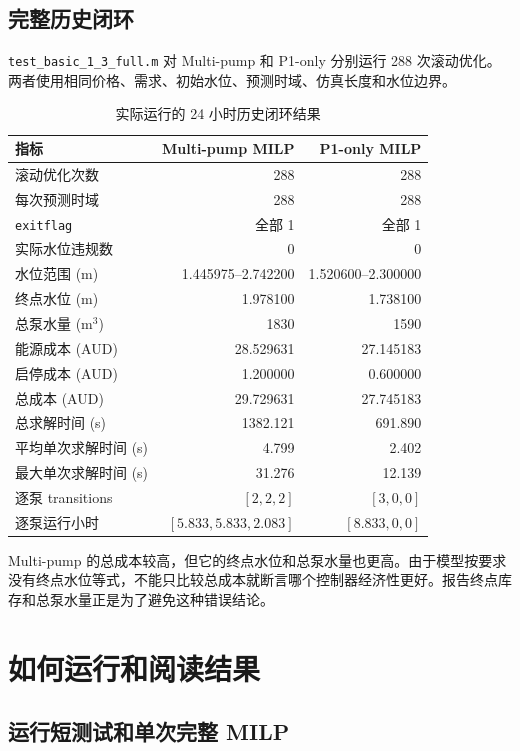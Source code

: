 \documentclass[UTF8,a4paper,11pt]{ctexart}
\newcommand{\code}[1]{\texttt{#1}}
\newcommand{\important}[1]{%
  \begin{center}
  \colorbox{warningyellow}{\parbox{0.94\linewidth}{#1}}
  \end{center}}
\begin{document}
\subsection{完整历史闭环}

\code{test\_basic\_1\_3\_full.m} 对 Multi-pump 和 P1-only 分别运行 288 次滚动优化。两者使用相同价格、需求、初始水位、预测时域、仿真长度和水位边界。

\begin{table}[htbp]
\centering
\caption{实际运行的 24 小时历史闭环结果}
\begin{tabular}{lrr}
\toprule
指标 & Multi-pump MILP & P1-only MILP \\
\midrule
滚动优化次数 & 288 & 288 \\
每次预测时域 & 288 & 288 \\
\code{exitflag} & 全部 1 & 全部 1 \\
实际水位违规数 & 0 & 0 \\
水位范围 (m) & 1.445975--2.742200 & 1.520600--2.300000 \\
终点水位 (m) & 1.978100 & 1.738100 \\
总泵水量 (m$^3$) & 1830 & 1590 \\
能源成本 (AUD) & 28.529631 & 27.145183 \\
启停成本 (AUD) & 1.200000 & 0.600000 \\
总成本 (AUD) & 29.729631 & 27.745183 \\
总求解时间 (s) & 1382.121 & 691.890 \\
平均单次求解时间 (s) & 4.799 & 2.402 \\
最大单次求解时间 (s) & 31.276 & 12.139 \\
逐泵 transitions & $[2,2,2]$ & $[3,0,0]$ \\
逐泵运行小时 & $[5.833,5.833,2.083]$ & $[8.833,0,0]$ \\
\bottomrule
\end{tabular}
\end{table}

\important{Multi-pump 的总成本较高，但它的终点水位和总泵水量也更高。由于模型按要求没有终点水位等式，不能只比较总成本就断言哪个控制器经济性更好。报告终点库存和总泵水量正是为了避免这种错误结论。}

\section{如何运行和阅读结果}

\subsection{运行短测试和单次完整 MILP}
\end{document}
